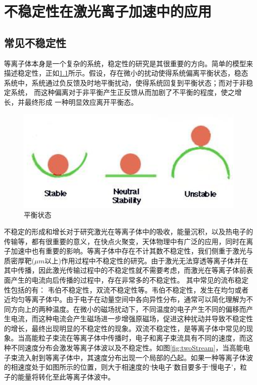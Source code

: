 \chapter{不稳定性在激光离子加速中的应用}
\label{chap:instability}



\section{常见不稳定性}
等离子体本身是一个复杂的系统，稳定性的研究是其很重要的方向。简单的模型来描述稳定性，正如\ref{fig:stable}所示。假设，存在微小的扰动使得系统偏离平衡状态，稳态系统中，系统通过负反馈及时地平衡扰动，使得系统回复到平衡状态；而对于非稳定系统，  而这种偏离对于非平衡产生正反馈从而加剧了不平衡的程度，使之增长，并最终形成 一种明显效应离开平衡态。
\begin{figure}[!htbp]
  \centering
  \includegraphics[width=\MyFactor\textwidth]{Img/stable.eps}
  \caption{平衡状态}
  \label{fig:stable}
\end{figure}



 不稳定的形成和增长对于研究激光在等离子体中的吸收，能量沉积，以及热电子的传输等，都有很重要的意义，在快点火聚变\cite{tabak1994ignition}，天体物理中有广泛的应用，同时在离子加速中也有重要的影响。等离子体中存在不计其数不稳定性，我们侧重于激光与质密厚靶($\mu m$以上)作用过程中不稳定性的研究。由于激光无法穿透等离子体并在其中传播，因此激光传输过程中的不稳定性就不需要考虑，而激光在等离子体前表面产生的电流向后传播的过程中，存在非常多的不稳定性。
其中常见的流布稳定性包括的有： 韦伯不稳定性\cite{weibel1959spontaneously}，双流不稳定性等。韦伯不稳定性，发生在均匀或者近均匀等离子体中。由于电子在动量空间中各向异性分布，通常可以简化理解为不同方向上的两种温度。在微小的磁场扰动下，不同温度的电子产生不同的偏移而产生电流，而这种电流会产生磁场进一步增强原磁场，促进这种扰动并导致不稳定性的增长，最终出现明显的不稳定性的现象。双流不稳定性，是等离子体中常见的现象。当高能粒子束流在等离子体中传播时，电子和离子束流具有不同的速度，而这种不同速度分布会激发等离子体波以及不稳定性。如图\ref{fig:twoStream}，当高能电子束流入射到等离子体中，其速度分布出现一个局部的凸起。如果一种等离子体波的相速度处于如图所示的位置，则大于相速度的‘快电子’数目要多于‘慢电子’，粒子的能量将转化至此等离子体波中。

